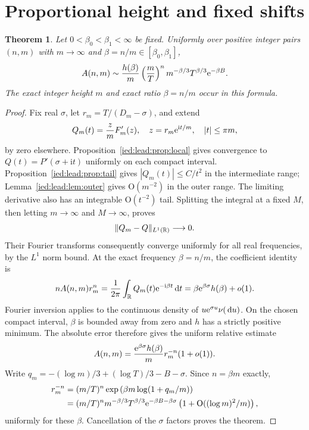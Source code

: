 \documentclass[11pt,letterpaper]{article}
\newtheorem{theorem}{Theorem}[section]
\theoremstyle{remark}\newtheorem{remark}[theorem]{Remark}
\newcommand{\ii}{\mathrm i}\newcommand{\dd}{\,\mathrm d}
\newcommand{\Oh}{\mathrm O}\newcommand{\supp}{\operatorname{supp}}
\begin{document}
\section{Proportional height and fixed shifts}\label{ied:lead:sec:proportional}
\begin{theorem}\label{ied:lead:thm:proportional}
Let $0<\beta_0<\beta_1<\infty$ be fixed. Uniformly over positive integer pairs $(n,m)$ with $m\to\infty$ and $\beta=n/m\in[\beta_0,\beta_1]$,
\begin{equation}\label{ied:lead:eq:proportional}
 A(n,m)\sim\frac{h(\beta)}m
 \left(\frac mT\right)^n
 m^{-\beta/3}T^{\beta/3}\mathrm e^{-\beta B}.
\end{equation}
The exact integer height $m$ and exact ratio $\beta=n/m$ occur in this formula.
\end{theorem}
\begin{proof}
Fix real $\sigma$, let $r_m=T/(D_m-\sigma)$, and extend
\[
 Q_m(t)=\frac zmF_m'(z),\quad z=r_m\e^{\ii t/m},\quad |t|\le\pi m,
\]
by zero elsewhere. Proposition~\ref{ied:lead:prop:local} gives convergence to $Q(t)=P'(\sigma+\ii t)$ uniformly on each compact interval. Proposition~\ref{ied:lead:prop:tail} gives $|Q_m(t)|\le C/t^2$ in the intermediate range; Lemma~\ref{ied:lead:lem:outer} gives $\Oh(m^{-2})$ in the outer range. The limiting derivative also has an integrable $\Oh(t^{-2})$ tail. Splitting the integral at a fixed $M$, then letting $m\to\infty$ and $M\to\infty$, proves
\[
 \|Q_m-Q\|_{L^1(\mathbb R)}\longrightarrow0.
\]
Their Fourier transforms consequently converge uniformly for all real frequencies, by the $L^1$ norm bound. At the exact frequency $\beta=n/m$, the coefficient identity is
\[
 n A(n,m)r_m^n=\frac1{2\pi}\int_\R Q_m(t)\e^{-\ii\beta t}\dd t
 =\beta\e^{\beta\sigma}h(\beta)+o(1).
\]
Fourier inversion applies to the continuous density of $u\e^{\sigma u}\nu(\dd u)$. On the chosen compact interval, $\beta$ is bounded away from zero and $h$ has a strictly positive minimum. The absolute error therefore gives the uniform relative estimate
\[
 A(n,m)=\frac{\mathrm e^{\beta\sigma}h(\beta)}m r_m^{-n}(1+o(1)).
\]
Write $q_m=-(\log m)/3+(\log T)/3-B-\sigma$. Since $n=\beta m$ exactly,
\begin{align*}
 r_m^{-n}
 &= (m/T)^n\exp\left(\beta m\log(1+q_m/m)\right)\\
 &= (m/T)^n m^{-\beta/3}T^{\beta/3}
       \e^{-\beta B-\beta\sigma}
       \left(1+\Oh((\log m)^2/m)\right),
\end{align*}
uniformly for these $\beta$. Cancellation of the $\sigma$ factors proves the theorem.
\end{proof}
\end{document}
